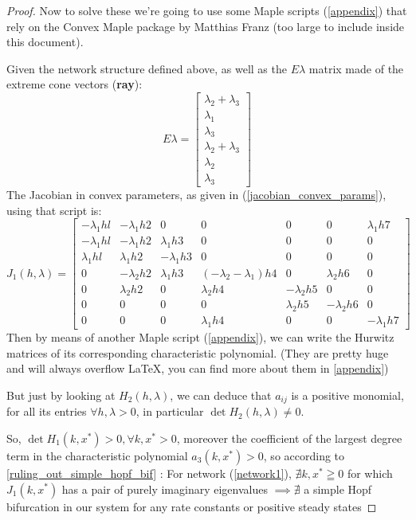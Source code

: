 \begin{proof}
	Now to solve these we're going to use some Maple scripts (\ref{appendix}) that rely on the Convex Maple package  by Matthias Franz \cite{franz2016ConvexMaple} (too large to include inside this document).

	Given the network structure defined above, as well as the $E\lambda$ matrix made of the extreme cone vectors (\textbf{ray}):
	\[
		E\lambda =
		\begin{bmatrix}
			\lambda_2 + \lambda_3 \\
			\lambda_1 \\
			\lambda_3 \\
			\lambda_2 + \lambda_3 \\
			\lambda_2 \\
			\lambda_3
		\end{bmatrix}
	\]
	The Jacobian in convex parameters, as given in (\ref{jacobian_convex_params}), using that script is:
	\[
		\left. J_1(h,\lambda)=
		\left[
			\begin{array}{ccccccc}-\lambda_1hl&-\lambda_1h2&0&0&0&0&\lambda_1h7\\-\lambda_1hl&-\lambda_1h2&\lambda_1h3&0&0&0&0\\\lambda_1hl&\lambda_1h2&-\lambda_1h3&0&0&0&0\\0&-\lambda_2h2&\lambda_1h3&(-\lambda_2-\lambda_1)h4&0&\lambda_2h6&0\\0&\lambda_2h2&0&\lambda_2h4&-\lambda_2h5&0&0\\0&0&0&0&\lambda_2h5&-\lambda_2h6&0\\0&0&0&\lambda_1h4&0&0&-\lambda_1h7
		\end{array}\right.\right]
	\]
	Then by means of another Maple script (\ref{appendix}), we can write the Hurwitz matrices of its corresponding characteristic polynomial. (They are pretty huge and will always overflow \LaTeX, you can find more about them in \ref{appendix})

	But just by looking at $H_2(h,\lambda)$, we can deduce that $a_{ij}$ is a positive monomial, for all  its entries $\forall h , \lambda > 0$, in particular $\det H_2(h, \lambda) \neq 0$.

	So, $\det H_1(k,x^*) > 0, \forall k, x^* > 0$, moreover the coefficient of the largest degree term in the characteristic polynomial $a_3(k, x^*) > 0$, so according to \ref{ruling_out_simple_hopf_bif} : For network (\ref{network1}), $\nexists k, x^* \geqq 0$ for which $J_1(k,x^*)$ has a pair of purely imaginary eigenvalues $\implies \nexists$ a simple Hopf bifurcation in our system for any rate constants or positive steady states
\end{proof}

